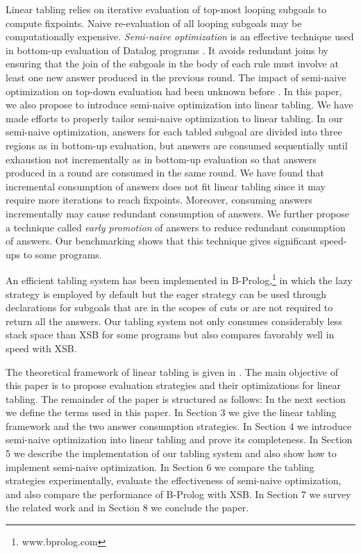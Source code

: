 \documentclass{tlp}
\begin{document}
Linear tabling relies on iterative evaluation of top-most looping subgoals to compute fixpoints. Naive re-evaluation of all looping subgoals may be computationally expensive. {\it Semi-naive optimization} is an effective technique used in bottom-up evaluation of Datalog programs \cite{Banc86,Ullman88}. It avoids redundant joins by ensuring that the join of the subgoals in the body of each rule must involve at least one new answer produced in the previous round. The impact of semi-naive optimization on top-down evaluation had been unknown before \cite{Zhou04}. In this paper, we also propose to introduce semi-naive optimization into linear tabling. We have made efforts to properly tailor semi-naive optimization to linear tabling. In our semi-naive optimization, answers for each tabled subgoal are divided into three regions as in bottom-up evaluation, but answers are consumed sequentially until exhaustion not incrementally as in bottom-up evaluation so that answers produced in a round are consumed in the same round. We have found that incremental consumption of answers does not fit linear tabling since it may require more iterations to reach fixpoints. Moreover, consuming answers incrementally may cause redundant consumption of answers. We further propose a technique called {\it early promotion} of answers to reduce redundant consumption of answers.  Our benchmarking shows that this technique gives significant speed-ups to some programs.

An efficient tabling system has been implemented in B-Prolog,\footnote{www.bprolog.com} in which the lazy strategy is employed by default but the eager strategy can be used through declarations for subgoals that are in the scopes of cuts or are not required to return all the answers. Our tabling system not only consumes considerably less stack space than XSB for some programs but also compares favorably well in speed with XSB.

The theoretical framework of linear tabling is given in \cite{Shen01}. The main objective of this paper is to propose evaluation strategies and their optimizations for linear tabling. The remainder of the paper is structured as follows: In the next section we define the terms used in this paper. In Section 3 we give the linear tabling framework and the two answer consumption strategies. In Section 4 we introduce semi-naive optimization into linear tabling and prove its completeness. In Section 5 we describe the implementation of our tabling system and also show how to implement semi-naive optimization. In Section 6 we compare the tabling strategies experimentally, evaluate the effectiveness of semi-naive optimization, and also compare the performance of B-Prolog with XSB. In Section 7 we survey the related work and in Section 8 we conclude the paper.
\end{document}
